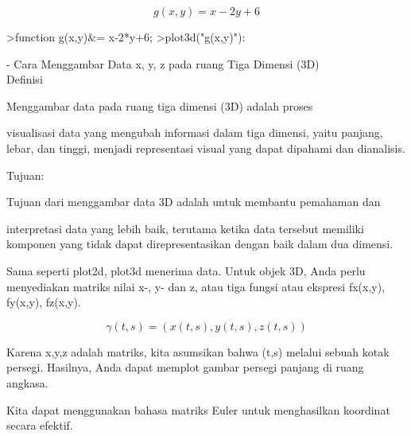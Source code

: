 \documentclass[a4paper,10pt]{article}
\begin{document}
\begin{eulernotebook}
\begin{eulercomment}
\begin{eulercomment}
\begin{eulercomment}
\end{eulercomment}
\begin{eulerformula}
\[
g(x,y)=x-2y+6
\]
\end{eulerformula}
\begin{eulerprompt}
>function g(x,y)&= x-2*y+6;
>plot3d("g(x,y)"):
\end{eulerprompt}
\begin{eulercomment}
- Cara Menggambar Data \textdollar{}x\textdollar{}, \textdollar{}y\textdollar{}, \textdollar{}z\textdollar{} pada ruang Tiga Dimensi (3D)\\
Definisi

\end{eulercomment}
\begin{eulerttcomment}
  Menggambar data pada ruang tiga dimensi (3D) adalah proses
\end{eulerttcomment}
\begin{eulercomment}
visualisasi data yang mengubah informasi dalam tiga dimensi, yaitu
panjang, lebar, dan tinggi, menjadi representasi visual yang dapat
dipahami dan dianalisis.

Tujuan:

\end{eulercomment}
\begin{eulerttcomment}
  Tujuan dari menggambar data 3D adalah untuk membantu pemahaman dan
\end{eulerttcomment}
\begin{eulercomment}
interpretasi data yang lebih baik, terutama ketika data tersebut
memiliki komponen yang tidak dapat direpresentasikan dengan baik dalam
dua dimensi.

Sama seperti plot2d, plot3d menerima data. Untuk objek 3D, Anda perlu
menyediakan matriks nilai x-, y- dan z, atau tiga fungsi atau ekspresi
fx(x,y), fy(x,y), fz(x,y).

\end{eulercomment}
\begin{eulerformula}
\[
\gamma(t,s) = (x(t,s),y(t,s),z(t,s))
\]
\end{eulerformula}
\begin{eulercomment}
Karena x,y,z adalah matriks, kita asumsikan bahwa (t,s) melalui sebuah
kotak persegi. Hasilnya, Anda dapat memplot gambar persegi panjang di
ruang angkasa.

Kita dapat menggunakan bahasa matriks Euler untuk menghasilkan
koordinat secara efektif.


\end{eulercomment}
\end{eulercomment}
\end{eulercomment}
\end{eulernotebook}
\end{document}
